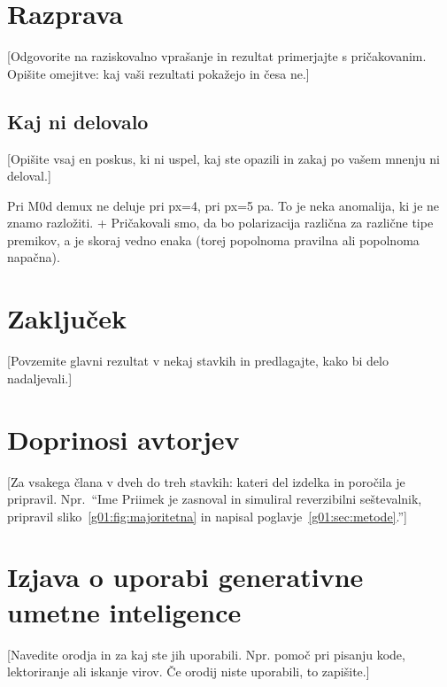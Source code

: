 \section{Razprava}

\label{g01:sec:razprava}

[Odgovorite na raziskovalno vprašanje in rezultat primerjajte s pričakovanim. Opišite omejitve: kaj vaši rezultati pokažejo in česa ne.]

\subsection{Kaj ni delovalo}
\label{g01:sec:neuspehi}

[Opišite vsaj en poskus, ki ni uspel, kaj ste opazili in zakaj po vašem mnenju ni deloval.]

Pri M0d demux ne deluje pri px=4, pri px=5 pa. To je neka anomalija, ki je ne znamo razložiti. 
+ Pričakovali smo, da bo polarizacija različna za različne tipe premikov, a je skoraj vedno enaka (torej popolnoma pravilna ali popolnoma napačna).

\section{Zaključek}
\label{g01:sec:zakljucek}

[Povzemite glavni rezultat v nekaj stavkih in predlagajte, kako bi delo nadaljevali.]


\section*{Doprinosi avtorjev}

[Za vsakega člana v dveh do treh stavkih: kateri del izdelka in poročila je pripravil. Npr.\ \enquote{Ime Priimek je zasnoval in simuliral reverzibilni seštevalnik, pripravil sliko~\ref{g01:fig:majoritetna} in napisal poglavje~\ref{g01:sec:metode}.}]

\section*{Izjava o uporabi generativne umetne inteligence}

[Navedite orodja in za kaj ste jih uporabili. Npr. pomoč pri pisanju kode, lektoriranje ali iskanje virov. Če orodij niste uporabili, to zapišite.]
